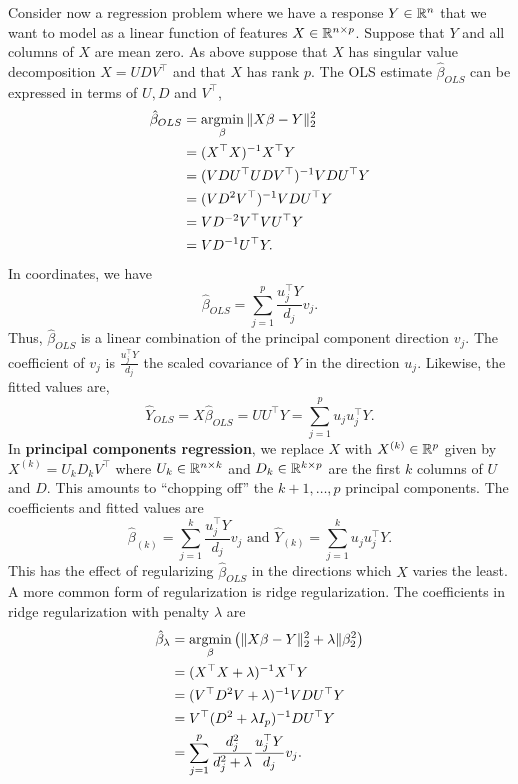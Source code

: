 Consider now a regression problem where we have a response $Y \in \mathbb{R}^n$ that we want to model as a linear function of features $X \in \mathbb{R}^{n \times p}$. Suppose that $Y$ and all columns of $X$ are mean zero. As above suppose that $X$ has singular value decomposition $X=UDV^\top$ and that $X$ has rank $p$. The OLS estimate $\hat{\beta}_{OLS}$ can be expressed in terms of $U,D$ and $V^\top$,
\begin{align*}
    \hat{\beta}_{OLS}&=\operatorname*{argmin}_{\beta} \Vert X\beta - Y \Vert_2^2 \\
    &=(X^\top X)^{-1}X^\top Y\\
    &=(VDU^\top U D V^\top)^{-1}V DU^\top Y\\
    &=(VD^2 V^\top)^{-1} VDU^\top Y\\
    &=VD^{-2}V^\top VU^\top Y\\
    &=VD^{-1}U^\top Y.
\end{align*}
In coordinates, we have
\[\hat{\beta}_{OLS} = \sum_{j=1}^p \frac{u_j^\top Y}{d_j}v_j. \]
Thus, $\hat{\beta}_{OLS}$ is a linear combination of the principal component direction $v_j$. The coefficient of $v_j$ is $\frac{u_j^\top Y}{d_j}$ the scaled covariance of $Y$ in the direction $u_j$. Likewise, the fitted values are,
\[\widehat{Y}_{OLS} = X\hat{\beta}_{OLS} = UU^\top Y =  \sum_{j=1}^p u_ju_j^\top Y. \]
In \textbf{principal components regression}, we replace $X$ with $X^{(k)} \in \mathbb{R}^p$ given by $X^{(k)}= U_k D_k V^\top$ where $U_k \in \mathbb{R}^{n \times k}$ and $D_k \in \mathbb{R}^{k \times p}$ are the first $k$ columns of $U$ and $D$. This amounts to ``chopping off'' the $k+1,\ldots,p$ principal components. The coefficients and fitted values are 
\[\hat{\beta}_{(k)} = \sum_{j=1}^k \frac{u_j^\top Y}{d_j} v_j \text{ and } \hat{Y}_{(k)} = \sum_{j=1}^k u_ju_j^\top Y. \]
This has the effect of regularizing $\hat{\beta}_{OLS}$ in the directions which $X$ varies the least. A more common form of regularization is ridge regularization. The coefficients in ridge regularization with penalty $\lambda$ are
\begin{align*}
    \hat{\beta}_\lambda&=\operatorname*{argmin}_\beta \left(\Vert X \beta - Y \Vert_2^2 + \lambda \Vert \beta_2^2 \right)\\
    &=(X^\top X + \lambda)^{-1}X^\top Y\\
    &=(V^\top D^2 V + \lambda)^{-1}VDU^\top Y\\
    &=V^\top (D^2+\lambda I_p)^{-1}DU^\top Y\\
    &=\sum_{j=1}^p \frac{d_j^2}{d_j^2+\lambda} \frac{u_j^\top Y}{d_j}v_j.
\end{align*}
